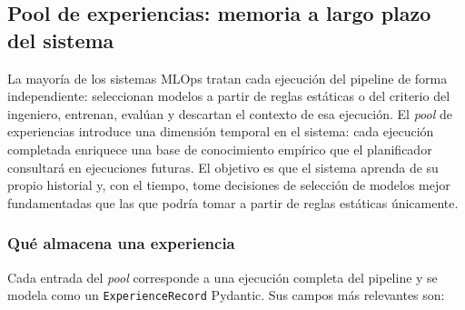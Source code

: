 \subsection{Pool de experiencias: memoria a largo plazo del sistema}
\label{sec:experience-pool-detalle}

La mayoría de los sistemas MLOps tratan cada ejecución del pipeline de forma independiente: seleccionan modelos a partir de reglas estáticas o del criterio del ingeniero, entrenan, evalúan y descartan el contexto de esa ejecución. El \emph{pool} de experiencias introduce una dimensión temporal en el sistema: cada ejecución completada enriquece una base de conocimiento empírico que el planificador consultará en ejecuciones futuras. El objetivo es que el sistema aprenda de su propio historial y, con el tiempo, tome decisiones de selección de modelos mejor fundamentadas que las que podría tomar a partir de reglas estáticas únicamente.

\subsubsection*{Qué almacena una experiencia}
\label{sec:experience-schema}

Cada entrada del \emph{pool} corresponde a una ejecución completa del pipeline y se modela como un \texttt{ExperienceRecord} Pydantic. Sus campos más relevantes son:

